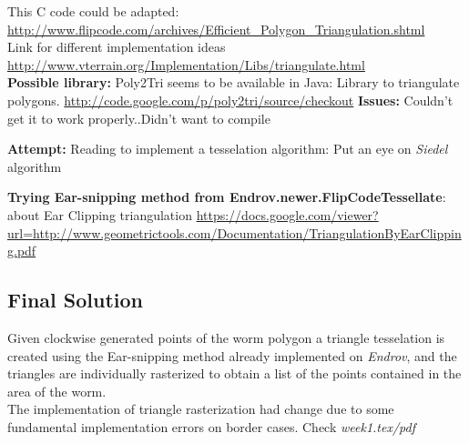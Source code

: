 \documentclass{article}
\begin{document}
This C code could be adapted: \url{http://www.flipcode.com/archives/Efficient_Polygon_Triangulation.shtml}\\
Link for different implementation ideas \url{http://www.vterrain.org/Implementation/Libs/triangulate.html}\\

\textbf{Possible library: }Poly2Tri seems to be available in Java: Library
to triangulate polygons. \url{http://code.google.com/p/poly2tri/source/checkout}
\textbf{Issues: } Couldn't get it to work properly..Didn't want to compile

\textbf{Attempt: }Reading to implement a tesselation algorithm: Put
an eye on \emph{Siedel} algorithm

\textbf{Trying Ear-snipping method from Endrov.newer.FlipCodeTessellate}:
about Ear Clipping triangulation \url{https://docs.google.com/viewer?url=http://www.geometrictools.com/Documentation/TriangulationByEarClipping.pdf}

\subsection{Final Solution}
Given clockwise generated points of the worm polygon a triangle tesselation
is created using the Ear-snipping method already implemented on
\emph{Endrov}, and the triangles are individually rasterized to obtain a list
of the points contained in the area of the worm.\\

The implementation of triangle rasterization had change due to some fundamental
implementation errors on border cases. Check \emph{week1.tex/pdf}
\end{document}
